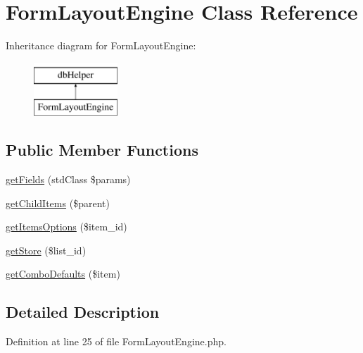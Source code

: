 \hypertarget{class_form_layout_engine}{\section{\-Form\-Layout\-Engine \-Class \-Reference}
\label{class_form_layout_engine}
}
\-Inheritance diagram for \-Form\-Layout\-Engine\-:\begin{figure}[H]
\begin{center}
\leavevmode
\includegraphics[height=2.000000cm]{class_form_layout_engine}
\end{center}
\end{figure}
\subsection*{\-Public \-Member \-Functions}
\begin{DoxyCompactItemize}
\item 
\hyperlink{class_form_layout_engine_aac0ec25d9ed7255a0d2e2ad1174d324b}{get\-Fields} (std\-Class \$params)
\item 
\hyperlink{class_form_layout_engine_a25eb9dec9c7fa7132bc97c113aae2bfe}{get\-Child\-Items} (\$parent)
\item 
\hyperlink{class_form_layout_engine_a89955ff647a3d7183e3468bac90f90a0}{get\-Items\-Options} (\$item\-\_\-id)
\item 
\hyperlink{class_form_layout_engine_a5b15a478954309f198a8435ce45e1997}{get\-Store} (\$list\-\_\-id)
\item 
\hyperlink{class_form_layout_engine_a8ac8fd2609c4b0bc23b1deaa36c2a43f}{get\-Combo\-Defaults} (\$item)
\end{DoxyCompactItemize}


\subsection{\-Detailed \-Description}


\-Definition at line 25 of file \-Form\-Layout\-Engine.\-php.



